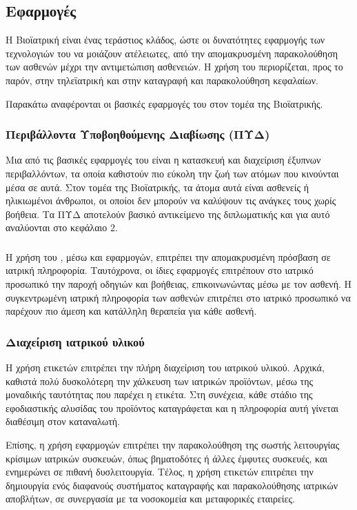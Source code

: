 \subsection{Εφαρμογές}
Η Βιοϊατρική είναι ένας τεράστιος κλάδος, ώστε οι δυνατότητες εφαρμογής των τεχνολογιών του  να μοιάζουν ατέλειωτες, από την απομακρυσμένη παρακολούθηση των ασθενών μέχρι την αντιμετώπιση ασθενειών.
Η χρήση του  περιορίζεται, προς το παρόν, στην τηλεϊατρική και στην καταγραφή και παρακολούθηση κεφαλαίων.
\par
Παρακάτω αναφέρονται οι βασικές εφαρμογές του  στον τομέα της Βιοϊατρικής.
\subsubsection{Περιβάλλοντα Υποβοηθούμενης Διαβίωσης (ΠΥΔ)}
Μια από τις βασικές εφαρμογές του  είναι η κατασκευή και διαχείριση έξυπνων περιβαλλόντων, τα οποία καθιστούν πιο εύκολη την ζωή των ατόμων που κινούνται μέσα σε αυτά.
Στον τομέα της Βιοϊατρικής, τα άτομα αυτά είναι ασθενείς ή ηλικιωμένοι άνθρωποι, οι οποίοι δεν μπορούν να καλύψουν τις ανάγκες τους χωρίς βοήθεια.
Τα ΠΥΔ αποτελούν βασικό αντικείμενο της διπλωματικής και για αυτό αναλύονται στο κεφάλαιο 2.
\subsubsection{}
Η χρήση του , μέσω  και  εφαρμογών, επιτρέπει την απομακρυσμένη πρόσβαση σε ιατρική πληροφορία.
Ταυτόχρονα, οι ίδιες εφαρμογές επιτρέπουν στο ιατρικό προσωπικό την παροχή οδηγιών και βοήθειας, επικοινωνώντας μέσω  με τον ασθενή.
Η συγκεντρωμένη ιατρική πληροφορία των ασθενών επιτρέπει στο ιατρικό προσωπικό να παρέχουν πιο άμεση και κατάλληλη θεραπεία για κάθε ασθενή.
\subsubsection{Διαχείριση ιατρικού υλικού}
Η χρήση ετικετών  επιτρέπει την πλήρη διαχείριση του ιατρικού υλικού.
Αρχικά, καθιστά πολύ δυσκολότερη την χάλκευση των ιατρικών προϊόντων, μέσω της μοναδικής ταυτότητας που παρέχει η  ετικέτα.
Στη συνέχεια, κάθε στάδιο της εφοδιαστικής αλυσίδας του προϊόντος καταγράφεται και η πληροφορία αυτή γίνεται διαθέσιμη στον καταναλωτή.
\par
Επίσης, η χρήση εφαρμογών  επιτρέπει την παρακολούθηση της σωστής λειτουργίας κρίσιμων ιατρικών συσκευών, όπως βηματοδότες ή άλλες έμφυτες συσκευές, και ενημερώνει σε πιθανή δυσλειτουργία.
Τέλος, η χρήση ετικετών  επιτρέπει την δημιουργία ενός διαφανούς συστήματος καταγραφής και παρακολούθησης ιατρικών αποβλήτων, σε συνεργασία με τα νοσοκομεία και μεταφορικές εταιρείες. 
